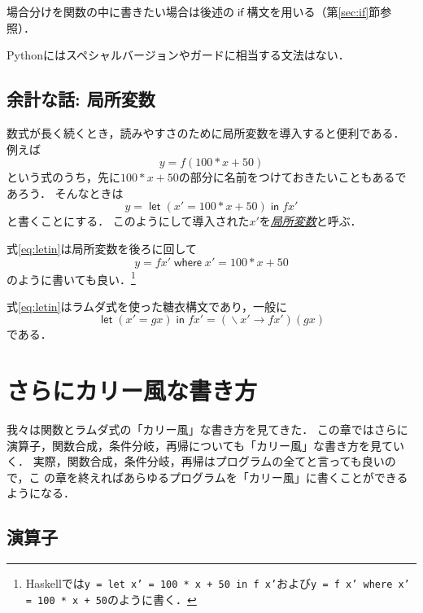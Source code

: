 \documentclass[a5paper,draft]{jsbook}
\newcommand{\programminglanguage}[1]{\textsf{#1}}
\newcommand{\haskell}{\programminglanguage{Haskell}}
\newcommand{\python}{\programminglanguage{Python}}
\newenvironment{leader}{\begingroup}{\endgroup}
\newcommand{\keyword}[1]{{\underline{\emph{#1}}}}
\newcommand{\code}[1]{\texttt{#1}}
\DeclareMathOperator{\mathLambda}{\backslash}
\newcommand{\mathLambdaArrow}{\rightarrow}
\newcommand{\mathKeyword}[1]{\operatorname{\textsf{#1}}}
\newcommand{\mathIf}{\mathKeyword{if}}
\newcommand{\mathLetLet}{\mathKeyword{let}}
\newcommand{\mathLetIn}{\mathKeyword{in}}
\newcommand{\mathWhere}{\mathKeyword{where}}
\newcommand{\mathLambdaExpression}[2]{\mathLambda#1\mathLambdaArrow#2}
\newcommand{\mathLet}[2]{\mathLetLet#1\mathLetIn#2}
\begin{document}
場合分けを関数の中に書きたい場合は後述の$\mathIf$構文を用いる（第\ref{sec:if}節参照）．

\python にはスペシャルバージョンやガードに相当する文法はない．

\section{余計な話: 局所変数}

数式が長く続くとき，読みやすさのために局所変数を導入すると便利である．
例えば
\begin{equation}
y=f\left(100*x+50\right)
\end{equation}
という式のうち，先に$100*x+50$の部分に名前をつけておきたいこともあるであろう．
そんなときは
\begin{equation}
\label{eq:letin}
y=\mathLet{\left(x'=100*x+50\right)}{fx'}
\end{equation}
と書くことにする．
このようにして導入された$x'$を\keyword{局所変数}と呼ぶ．

式\eqref{eq:letin}は局所変数を後ろに回して
\begin{equation}
y=fx'\mathWhere x'=100*x+50
\end{equation}
のように書いても良い．\footnote{\haskell では\code{y = let x' = 100 * x + 50 in f x'}および\code{y = f x' where x' = 100 * x + 50}のように書く．}

式\eqref{eq:letin}はラムダ式を使った糖衣構文であり，一般に
\begin{equation}
\mathLet{\left(x'=gx\right)}{fx'}=(\mathLambdaExpression{x'}{fx'})(gx)
\end{equation}
である．

\chapter{さらにカリー風な書き方}

\begin{leader}
我々は関数とラムダ式の「カリー風」な書き方を見てきた．
この章ではさらに演算子，関数合成，条件分岐，再帰についても「カリー風」な書き方を見ていく．
実際，関数合成，条件分岐，再帰はプログラムの全てと言っても良いので，こ
の章を終えればあらゆるプログラムを「カリー風」に書くことができるようになる．
\end{leader}

\section{演算子}
\end{document}
